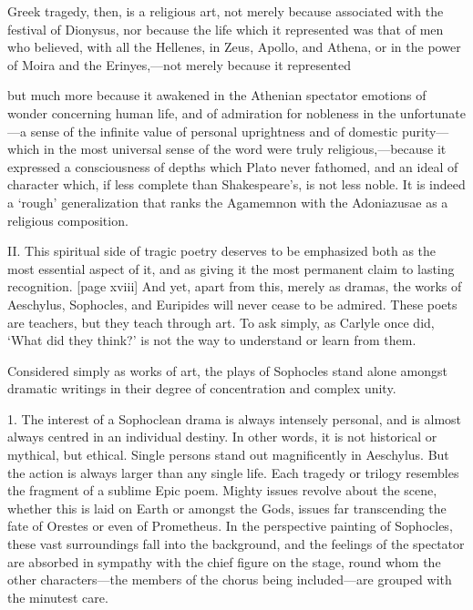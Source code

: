 \documentclass[11pt,letter]{book}
\begin{document}
\par  Greek tragedy, then, is a religious art, not merely because associated with the festival of Dionysus, nor because the life which it represented was that of men who believed, with all the Hellenes, in Zeus, Apollo, and Athena, or in the power of Moira and the Erinyes,—not merely because it represented
 
\par  but much more because it awakened in the Athenian spectator emotions of wonder concerning human life, and of admiration for nobleness in the unfortunate—a sense of the infinite value of personal uprightness and of domestic purity—which in the most universal sense of the word were truly religious,—because it expressed a consciousness of depths which Plato never fathomed, and an ideal of character which, if less complete than Shakespeare’s, is not less noble. It is indeed a ‘rough’ generalization that ranks the Agamemnon with the Adoniazusae as a religious composition.

\par  II. This spiritual side of tragic poetry deserves to be emphasized both as the most essential aspect of it, and as giving it the most permanent claim to lasting recognition. [page xviii] And yet, apart from this, merely as dramas, the works of Aeschylus, Sophocles, and Euripides will never cease to be admired. These poets are teachers, but they teach through art. To ask simply, as Carlyle once did, ‘What did they think?’ is not the way to understand or learn from them.

\par  Considered simply as works of art, the plays of Sophocles stand alone amongst dramatic writings in their degree of concentration and complex unity.

\par  1. The interest of a Sophoclean drama is always intensely personal, and is almost always centred in an individual destiny. In other words, it is not historical or mythical, but ethical. Single persons stand out magnificently in Aeschylus. But the action is always larger than any single life. Each tragedy or trilogy resembles the fragment of a sublime Epic poem. Mighty issues revolve about the scene, whether this is laid on Earth or amongst the Gods, issues far transcending the fate of Orestes or even of Prometheus. In the perspective painting of Sophocles, these vast surroundings fall into the background, and the feelings of the spectator are absorbed in sympathy with the chief figure on the stage, round whom the other characters—the members of the chorus being included—are grouped with the minutest care.
\end{document}
